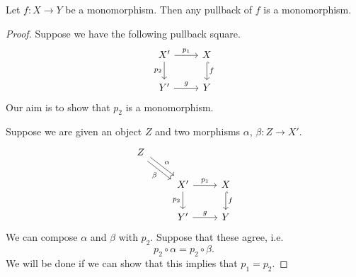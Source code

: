 \documentclass[notes.tex]{subfiles}
\begin{document}
\begin{lemma}
  Let $f\colon X \to Y$ be a monomorphism. Then any pullback of $f$ is a monomorphism.
\end{lemma}
\begin{proof}
  Suppose we have the following pullback square.
  \begin{equation*}
    \begin{tikzcd}
      X'
      \arrow[r, "p_{1}"]
      \arrow[d, swap, "p_{2}"]
      & X
      \arrow[d, hookrightarrow, "f"]
      \\
      Y'
      \arrow[r, "g"]
      & Y
    \end{tikzcd}
  \end{equation*}
  Our aim is to show that $p_{2}$ is a monomorphism.

  Suppose we are given an object $Z$ and two morphisms $\alpha$, $\beta\colon Z \to X'$.
  \begin{equation*}
    \begin{tikzcd}
      Z
      \arrow[dr, shift left, "\alpha"]
      \arrow[dr, shift right, swap, "\beta"]
      \\
      & X'
      \arrow[r, "p_{1}"]
      \arrow[d, swap, "p_{2}"]
      & X
      \arrow[d, hookrightarrow, "f"]
      \\
      & Y'
      \arrow[r, "g"]
      & Y
    \end{tikzcd}
  \end{equation*}
  We can compose $\alpha$ and $\beta$ with $p_{2}$. Suppose that these agree, i.e.
  \begin{equation*}
    p_{2} \circ \alpha = p_{2} \circ \beta.
  \end{equation*}
  We will be done if we can show that this implies that $p_{1} = p_{2}$.


\end{proof}
\end{document}
